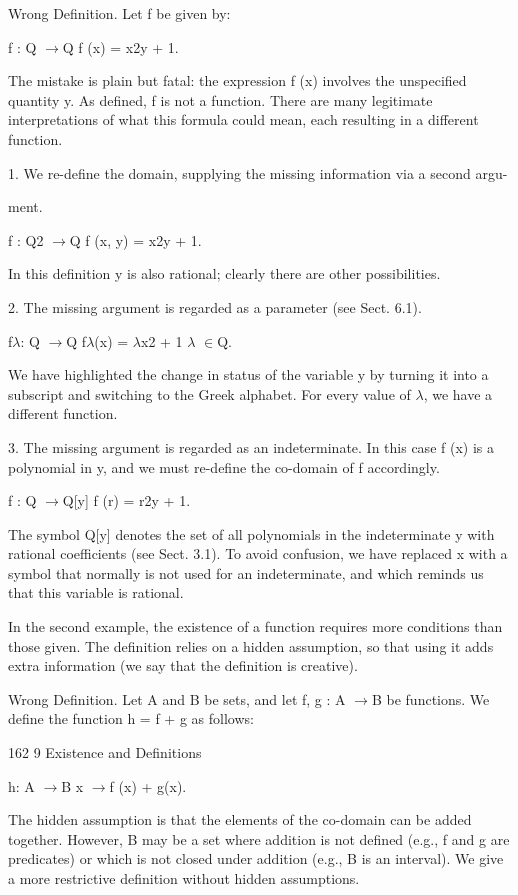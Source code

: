 \documentclass[11pt]{article}
\theoremstyle{plain}
\theoremstyle{definition}
\begin{document}
Wrong Definition. Let f be given by:

f : Q $\to$Q f (x) = x2y + 1.

The mistake is plain but fatal: the expression f (x) involves the unspecified quantity y. As defined, f is not a function. There are many legitimate interpretations of what this formula could mean, each resulting in a different function.

1. We re-define the domain, supplying the missing information via a second argu-

ment.

f : Q2 $\to$Q f (x, y) = x2y + 1.

In this definition y is also rational; clearly there are other possibilities.

2. The missing argument is regarded as a parameter (see Sect. 6.1).

f$\lambda$: Q $\to$Q f$\lambda$(x) = $\lambda$x2 + 1 $\lambda$ $\in$Q.

We have highlighted the change in status of the variable y by turning it into a subscript and switching to the Greek alphabet. For every value of $\lambda$, we have a different function.

3. The missing argument is regarded as an indeterminate. In this case f (x) is a polynomial in y, and we must re-define the co-domain of f accordingly.

f : Q $\to$Q[y] f (r) = r2y + 1.

The symbol Q[y] denotes the set of all polynomials in the indeterminate y with rational coefficients (see Sect. 3.1). To avoid confusion, we have replaced x with a symbol that normally is not used for an indeterminate, and which reminds us that this variable is rational.

In the second example, the existence of a function requires more conditions than those given. The definition relies on a hidden assumption, so that using it adds extra information (we say that the definition is creative).

Wrong Definition. Let A and B be sets, and let f, g : A $\to$B be functions. We define the function h = f + g as follows:

162 9 Existence and Definitions

h: A $\to$B x $\to$f (x) + g(x).

The hidden assumption is that the elements of the co-domain can be added together. However, B may be a set where addition is not defined (e.g., f and g are predicates) or which is not closed under addition (e.g., B is an interval). We give a more restrictive definition without hidden assumptions.
\end{document}
